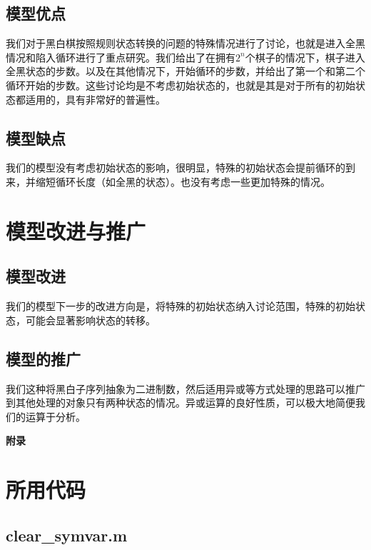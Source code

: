 \documentclass[12pt,AutoFakeSlant,AutoFakeBold]{article}
\begin{document}
\subsection{模型优点}

我们对于黑白棋按照规则状态转换的问题的特殊情况进行了讨论，也就是进入全黑情况和陷入循环进行了重点研究。我们给出了在拥有$2^n$个棋子的情况下，棋子进入全黑状态的步数。以及在其他情况下，开始循环的步数，并给出了第一个和第二个循环开始的步数。这些讨论均是不考虑初始状态的，也就是其是对于所有的初始状态都适用的，具有非常好的普遍性。

\subsection{模型缺点}

我们的模型没有考虑初始状态的影响，很明显，特殊的初始状态会提前循环的到来，并缩短循环长度（如全黑的状态）。也没有考虑一些更加特殊的情况。

\section{模型改进与推广}

\subsection{模型改进}

我们的模型下一步的改进方向是，将特殊的初始状态纳入讨论范围，特殊的初始状态，可能会显著影响状态的转移。

\subsection{模型的推广}

我们这种将黑白子序列抽象为二进制数，然后适用异或等方式处理的思路可以推广到其他处理的对象只有两种状态的情况。异或运算的良好性质，可以极大地简便我们的运算于分析。


\newpage




\newpage
\appendix
\centerline{\Large\heiti\textbf{附录}}

\section{所用代码}

\subsection{clear\_symvar.m}
\end{document}
